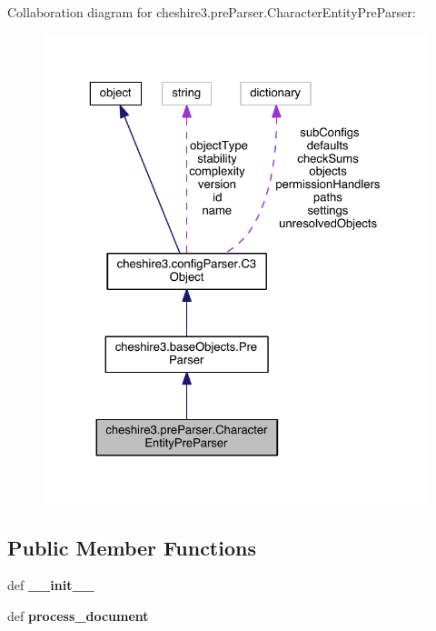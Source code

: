 Collaboration diagram for cheshire3.\-pre\-Parser.\-Character\-Entity\-Pre\-Parser\-:
\nopagebreak
\begin{figure}[H]
\begin{center}
\leavevmode
\includegraphics[width=325pt]{classcheshire3_1_1pre_parser_1_1_character_entity_pre_parser__coll__graph}
\end{center}
\end{figure}
\subsection*{Public Member Functions}
\begin{DoxyCompactItemize}
\item 
\hypertarget{classcheshire3_1_1pre_parser_1_1_character_entity_pre_parser_a402f736e8940e42b1445488d61e0c46b}{def {\bfseries \-\_\-\-\_\-init\-\_\-\-\_\-}}\label{classcheshire3_1_1pre_parser_1_1_character_entity_pre_parser_a402f736e8940e42b1445488d61e0c46b}

\item 
\hypertarget{classcheshire3_1_1pre_parser_1_1_character_entity_pre_parser_a68933be95dcddf2bc2564bbccf9bada6}{def {\bfseries process\-\_\-document}}\label{classcheshire3_1_1pre_parser_1_1_character_entity_pre_parser_a68933be95dcddf2bc2564bbccf9bada6}

\end{DoxyCompactItemize}
